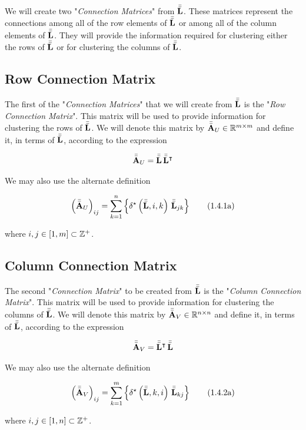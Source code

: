 \documentclass[../../ClusteringConnectionsMAIN.tex]{subfiles}
\begin{document}
\begin{flushleft}
\begin{large}


We will create two "\emph{Connection Matrices}" from $\bar{\bar{\mathbf{L}}}$.  These matrices represent the connections among all of the row elements of $\bar{\bar{\mathbf{L}}}$ or among all of the column elements of $\bar{\bar{\mathbf{L}}}$.  They will provide the information required for clustering either the rows of $\bar{\bar{\mathbf{L}}}$ or for clustering the columns of $\bar{\bar{\mathbf{L}}}$.


\subsection{Row Connection Matrix}

The first of the "\emph{Connection Matrices}" that we will create from $\bar{\bar{\mathbf{L}}}$ is the "\emph{Row Connection Matrix}".  This matrix will be used to provide information for clustering the rows of $\bar{\bar{\mathbf{L}}}$.  We will denote this matrix by $\bar{\bar{\mathbf{A}}}_U \in \mathbb{R}^{m \times m}$ and define it, in terms of $\bar{\bar{\mathbf{L}}}$, according to the expression

\begin{align}
\bar{\bar{\mathbf{A}}}_U = \bar{\bar{\mathbf{L}}} \, \bar{\bar{\mathbf{L}}}^\intercal
\end{align}

We may also use the alternate definition 

\begin{align}
\left( \bar{\bar{\mathbf{A}}}_U \right)_{ij} = \sum_{k = 1}^n \left\{ \delta^\star \left( \bar{\bar{\mathbf{L}}}, i, k \right) \, \bar{\bar{\mathbf{L}}}_{jk} \right\} \tag{1.4.1a}
\end{align}

where $i, j \in \left[ 1, m \right] \subset \mathbb{Z}^+$.


\subsection{Column Connection Matrix}

The second "\emph{Connection Matrix}" to be created from $\bar{\bar{\mathbf{L}}}$ is the "\emph{Column Connection Matrix}".  This matrix will be used to provide information for clustering the columns of $\bar{\bar{\mathbf{L}}}$.  We will denote this matrix by $\bar{\bar{\mathbf{A}}}_V \in \mathbb{R}^{n \times n}$ and define it, in terms of $\bar{\bar{\mathbf{L}}}$, according to the expression

\begin{align}
\bar{\bar{\mathbf{A}}}_V = \bar{\bar{\mathbf{L}}}^\intercal \, \bar{\bar{\mathbf{L}}}
\end{align}

We may also use the alternate definition 

\begin{align}
\left( \bar{\bar{\mathbf{A}}}_V \right)_{ij} = \sum_{k = 1}^m \left\{ \delta^\star \left( \bar{\bar{\mathbf{L}}}, k, i \right) \, \bar{\bar{\mathbf{L}}}_{kj} \right\} \tag{1.4.2a}
\end{align}

where $i, j \in \left[ 1, n \right] \subset \mathbb{Z}^+$.


\end{large}
\end{flushleft}
\end{document}
